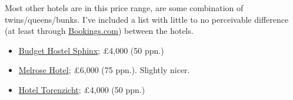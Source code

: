 \documentclass[12pt]{article}
\newcommand{\cost}[2]{\pounds#1 (#2 ppn.)}
\begin{document}
	Most other hotels are in this price range, are some combination of twins/queens/bunks. I've included a list with little to no perceivable difference (at least through \href{https://www.booking.com/}{Bookings.com}) between the hotels.
	\begin{itemize}
		\item \href{https://www.booking.com/hotel/nl/sphinx-amsterdam.html?aid=355028;sid=3f62ec944d118827daff72c411262409;all_sr_blocks=33109903_273950613_0_2_0%2C33109905_273950613_0_2_0%2C33109905_273950613_0_2_0;checkin=2022-05-28;checkout=2022-06-05;dest_id=145;dest_type=district;dist=0;group_adults=10;group_children=0;hapos=8;highlighted_blocks=33109903_273950613_0_2_0%2C33109905_273950613_0_2_0%2C33109905_273950613_0_2_0;hpos=8;matching_block_id=33109903_273950613_0_2_0;no_rooms=1;req_adults=10;req_children=0;room1=A%2CA%2CA%2CA%2CA%2CA%2CA%2CA%2CA%2CA;sb_price_type=total;sr_order=popularity;sr_pri_blocks=33109903_273950613_0_2_0__88022%2C33109905_273950613_0_2_0__183281%2C33109905_273950613_0_2_0__183281;srepoch=1648313785;srpvid=5a3f77194b1f019a;type=total;ucfs=1&#hotelTmpl}{Budget Hostel Sphinx}; \cost{4,000}{50}
		\item \href{https://www.booking.com/hotel/nl/the-edison.html?aid=355028;sid=3f62ec944d118827daff72c411262409;all_sr_blocks=281437405_107258932_0_0_0%2C281437405_107258932_0_0_0%2C281437401_107258932_0_0_0;checkin=2022-05-28;checkout=2022-06-05;dest_id=145;dest_type=district;dist=0;group_adults=10;group_children=0;hapos=9;highlighted_blocks=281437405_107258932_0_0_0%2C281437405_107258932_0_0_0%2C281437401_107258932_0_0_0;hpos=9;matching_block_id=281437405_107258932_0_0_0;no_rooms=1;req_adults=10;req_children=0;room1=A%2CA%2CA%2CA%2CA%2CA%2CA%2CA%2CA%2CA;sb_price_type=total;sr_order=popularity;sr_pri_blocks=281437405_107258932_0_0_0__263370%2C281437405_107258932_0_0_0__263370%2C281437401_107258932_0_0_0__171181;srepoch=1648313785;srpvid=5a3f77194b1f019a;type=total;ucfs=1&#hotelTmpl}{Melrose Hotel}; \cost{6,000}{75}. Slightly nicer.
		\item \href{https://www.booking.com/hotel/nl/torenzicht.html?aid=355028;sid=3f62ec944d118827daff72c411262409;all_sr_blocks=1067104_199448995_0_1_0%2C1067104_199448995_0_1_0%2C1067102_199448995_0_1_0;checkin=2022-05-28;checkout=2022-06-05;dest_id=145;dest_type=district;dist=0;group_adults=10;group_children=0;hapos=11;highlighted_blocks=1067104_199448995_0_1_0%2C1067104_199448995_0_1_0%2C1067102_199448995_0_1_0;hpos=11;matching_block_id=1067104_199448995_0_1_0;no_rooms=1;req_adults=10;req_children=0;room1=A%2CA%2CA%2CA%2CA%2CA%2CA%2CA%2CA%2CA;sb_price_type=total;sr_order=popularity;sr_pri_blocks=1067104_199448995_0_1_0__191100%2C1067104_199448995_0_1_0__191100%2C1067102_199448995_0_1_0__109300;srepoch=1648313785;srpvid=5a3f77194b1f019a;type=total;ucfs=1&#hotelTmpl}{Hotel Torenzicht}; \cost{4,000}{50}

\end{itemize}
\end{document}
